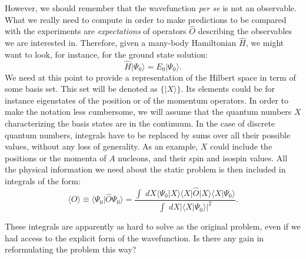 However, we should remember that the wavefunction {\it per se} is not an observable. What we really need to
compute in order to make predictions to be compared with the experiments are {\it expectations} of
operators $\hat{O}$ describing the observables we are interested in. Therefore, given a many-body Hamiltonian
$\hat{H}$, we might want to look, for instance, for the ground state solution:
\begin{equation}
\hat{H}\vert \Psi_0\rangle=E_0\vert \Psi_0\rangle.
\end{equation}  
We need at this point to provide a representation of the Hilbert space in term of some basis set.
This set will be denoted as $\{|X\rangle\}$. Its elements could be for instance eigenstates of the position
or of the momentum operators. In order to make the notation less cumbersome, we will assume that the quantum numbers $X$ characterizing the basis states are in the continuum. In the case of discrete quantum numbers, integrals have to be replaced by sums over all their possible values, without any loss of generality. As an example, $X$ could include the positions or the momenta of $A$ nucleons, and their spin and isospin values.  
All the physical information we need about the static problem is then included in integrals of the form:
\begin{equation}
\langle O\rangle \equiv\langle \Psi_0\vert\hat{O}\Psi_0\rangle =\frac{\displaystyle\int\; dX \langle \Psi_0\vert X\rangle\langle X\vert \hat{O}\vert X\rangle\langle X\vert\Psi_0\rangle}
{\displaystyle\int\; dX \vert\langle X\vert \Psi_0\rangle\vert^2}.
\end{equation}


These integrals are apparently as hard to solve as the original problem, even if we had access to the
explicit form of the wavefunction. Is there any gain in reformulating the problem this way?

